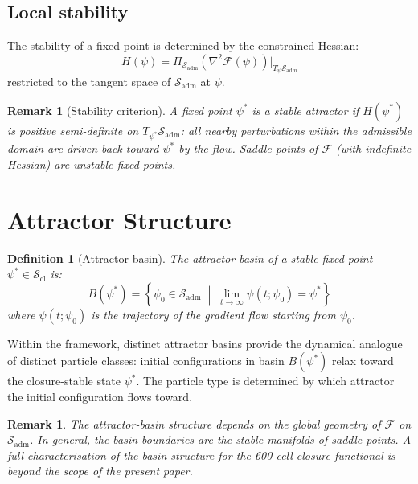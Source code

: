 \documentclass[12pt]{article}
\newtheorem{definition}[theorem]{Definition}
\newtheorem{remark}[theorem]{Remark}
\newcommand{\Fcal}{\mathcal{F}}
\newcommand{\Sadm}{\mathcal{S}_{\mathrm{adm}}}
\newcommand{\Scl}{\mathcal{S}_{\mathrm{cl}}}
\begin{document}
\subsection{Local stability}

The stability of a fixed point is determined by the constrained Hessian:
\begin{equation}\label{eq:hessian}
    H(\psi) = \Pi_{\Sadm}\!\left(\nabla^2 \Fcal(\psi)\right)\big|_{T_\psi \Sadm}
\end{equation}
restricted to the tangent space of $\Sadm$ at $\psi$.

\begin{remark}[Stability criterion]
A fixed point $\psi^*$ is a stable attractor if $H(\psi^*)$ is positive semi-definite on $T_{\psi^*} \Sadm$: all nearby perturbations within the admissible domain are driven back toward $\psi^*$ by the flow. Saddle points of $\Fcal$ (with indefinite Hessian) are unstable fixed points.
\end{remark}

\section{Attractor Structure}\label{sec:attractors}

\begin{definition}[Attractor basin]\label{def:basin}
The attractor basin of a stable fixed point $\psi^* \in \Scl$ is:
\begin{equation}
    B(\psi^*) = \left\{\psi_0 \in \Sadm \;\middle|\; \lim_{t \to \infty} \psi(t; \psi_0) = \psi^*\right\}
\end{equation}
where $\psi(t; \psi_0)$ is the trajectory of the gradient flow starting from $\psi_0$.
\end{definition}

Within the framework, distinct attractor basins provide the dynamical analogue of distinct particle classes: initial configurations in basin $B(\psi^*)$ relax toward the closure-stable state $\psi^*$. The particle type is determined by which attractor the initial configuration flows toward.

\begin{remark}
The attractor-basin structure depends on the global geometry of $\Fcal$ on $\Sadm$. In general, the basin boundaries are the stable manifolds of saddle points. A full characterisation of the basin structure for the 600-cell closure functional is beyond the scope of the present paper.
\end{remark}
\end{document}
